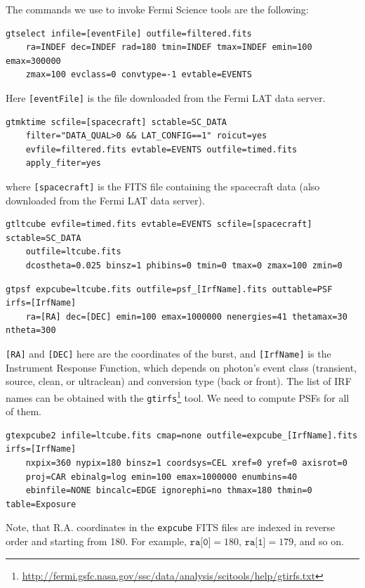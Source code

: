 \documentclass{article}
\begin{document}
\begin{appendices}
The commands we use to invoke Fermi Science tools are the following:
\begin{lstlisting}
gtselect infile=[eventFile] outfile=filtered.fits
	ra=INDEF dec=INDEF rad=180 tmin=INDEF tmax=INDEF emin=100 emax=300000
	zmax=100 evclass=0 convtype=-1 evtable=EVENTS
\end{lstlisting}
Here \texttt{[eventFile]} is the file downloaded from the Fermi LAT data server.

\begin{lstlisting}
gtmktime scfile=[spacecraft] sctable=SC_DATA
	filter="DATA_QUAL>0 && LAT_CONFIG==1" roicut=yes
	evfile=filtered.fits evtable=EVENTS outfile=timed.fits
	apply_fiter=yes
\end{lstlisting}
where \texttt{[spacecraft]} is the FITS file containing the spacecraft data (also downloaded from the Fermi LAT data server).

\begin{lstlisting}
gtltcube evfile=timed.fits evtable=EVENTS scfile=[spacecraft] sctable=SC_DATA
	outfile=ltcube.fits
	dcostheta=0.025 binsz=1 phibins=0 tmin=0 tmax=0 zmax=100 zmin=0
\end{lstlisting}

\begin{lstlisting}
gtpsf expcube=ltcube.fits outfile=psf_[IrfName].fits outtable=PSF irfs=[IrfName]
	ra=[RA] dec=[DEC] emin=100 emax=1000000 nenergies=41 thetamax=30 ntheta=300
\end{lstlisting}
\texttt{[RA]} and \texttt{[DEC]} here are the coordinates of the burst, and \texttt{[IrfName]} is the Instrument Response Function, which depends on photon's event class (transient, source, clean, or ultraclean) and conversion type (back or front). The list of IRF names can be obtained with the \texttt{gtirfs}\footnote{\url{http://fermi.gsfc.nasa.gov/ssc/data/analysis/scitools/help/gtirfs.txt}} tool. We need to compute PSFs for all of them.

\begin{lstlisting}
gtexpcube2 infile=ltcube.fits cmap=none outfile=expcube_[IrfName].fits irfs=[IrfName]
	nxpix=360 nypix=180 binsz=1 coordsys=CEL xref=0 yref=0 axisrot=0
	proj=CAR ebinalg=log emin=100 emax=1000000 enumbins=40
	ebinfile=NONE bincalc=EDGE ignorephi=no thmax=180 thmin=0 table=Exposure
\end{lstlisting}
Note, that R.A. coordinates in the \texttt{expcube} FITS files are indexed in reverse order and starting from 180. For example, $\texttt{ra[0]}=180$, $\texttt{ra[1]}=179$, and so on.

\end{appendices}



\end{document}
